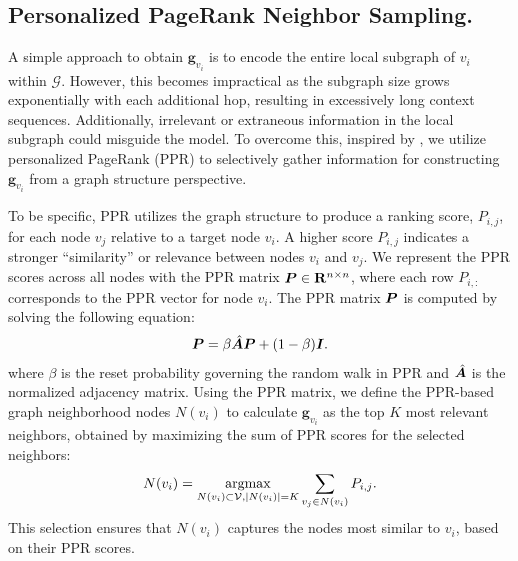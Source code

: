 \subsection{Personalized PageRank Neighbor Sampling.}\label{sec:sampling}
A simple approach to obtain $\bm{g}_{v_i}$ is to encode the entire local subgraph of $v_i$ within $\mathcal{G}$.
However, this becomes impractical as the subgraph size grows exponentially with each additional hop, resulting in excessively long context sequences.
Additionally, irrelevant or extraneous information in the local subgraph could misguide the model.
To overcome this, inspired by \cite{gasteiger2022predictpropagategraphneural}, we utilize personalized PageRank (PPR) to selectively gather information for constructing $\bm{g}_{v_i}$ from a graph structure perspective.

To be specific, PPR \cite{haveliwala2002topic} utilizes the graph structure to produce a ranking score, $P_{i,j}$, for each node $v_j$ relative to a target node $v_i$. A higher score $P_{i,j}$ indicates a stronger “similarity” or relevance between nodes $v_i$ and $v_j$. We represent the PPR scores across all nodes with the PPR matrix ${\bm P}\in \mathbf{R}^{n\times n}$, where each row $P_{i,:}$ corresponds to the PPR vector for node $v_i$. The PPR matrix ${\bm P}$ is computed by solving the following equation:
\begin{gather}\label{eq:ppr}
    {\bm P} = \beta \hat{{\bm A}}{\bm P} + (1-\beta){\bm I}.
\end{gather}
where $\beta$ is the reset probability governing the random walk in PPR and $\hat{{\bm A}}$ is the normalized adjacency matrix.
Using the PPR matrix, we define the PPR-based graph neighborhood nodes $N(v_i)$ to calculate $\bm{g}_{v_i}$ as the top $K$ most relevant neighbors, obtained by maximizing the sum of PPR scores for the selected neighbors:
\begin{gather}
   N(v_i) = \operatorname*{argmax}_{N(v_i)\subset\mathcal{V}, |N(v_i)|=K} \sum_{v_j\in N(v_i)} P_{i, j}.
\end{gather}
This selection ensures that $N(v_i)$ captures the nodes most similar to $v_i$, based on their PPR scores.

